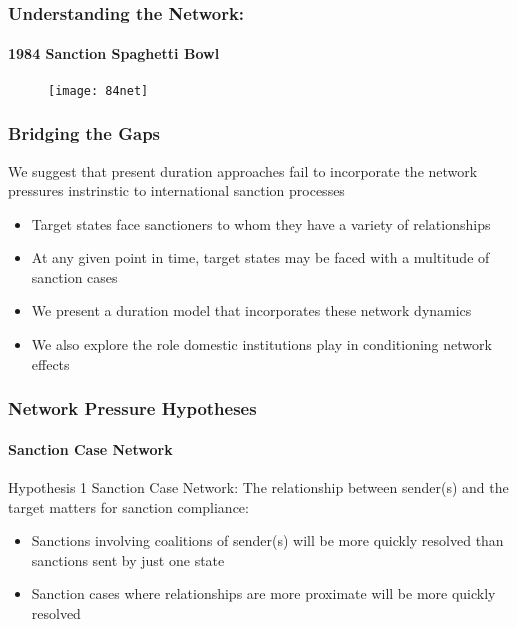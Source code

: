 \begin{frame}
\frametitle{Understanding the Network:}
\framesubtitle{1984 Sanction Spaghetti Bowl}
\vspace{-0.25cm}
\begin{figure}[ht]
  \centering
  \texttt{[image: 84net]}
\end{figure}

\end{frame}

\begin{frame}
\frametitle{Bridging the Gaps}
We suggest that present duration approaches fail to incorporate the network pressures instrinstic to international sanction processes

\begin{itemize}
	\item Target states face sanctioners to whom they have a variety of relationships
	\item At any given point in time, target states may be faced with a multitude of sanction cases
	\item We present a duration model that incorporates these network dynamics
	\item We also explore the role domestic institutions play in conditioning network effects
\end{itemize}

\end{frame}


\begin{frame}
\frametitle{Network Pressure Hypotheses}
\framesubtitle{Sanction Case Network}

\begin{block}{Hypothesis 1}
	Sanction Case Network: The relationship between sender(s) and the target matters for sanction compliance: 
\end{block}

\begin{itemize}
	\item Sanctions involving coalitions of sender(s) will be more quickly resolved than sanctions sent by just one state
	\item Sanction cases where relationships are more proximate will be more quickly resolved
\end{itemize}

\end{frame}

